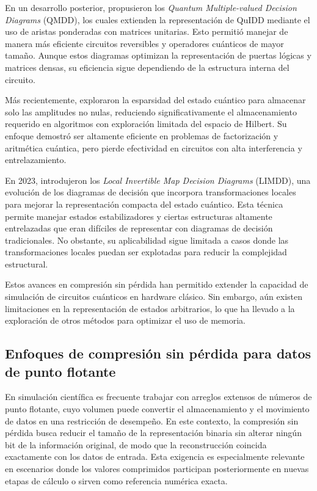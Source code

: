 En un desarrollo posterior, \textcite{Miller2006} propusieron los \textit{Quantum
Multiple-valued Decision Diagrams} (QMDD), los cuales extienden la
representación de QuIDD mediante el uso de aristas ponderadas con matrices
unitarias. Esto permitió manejar de manera más eficiente circuitos reversibles
y operadores cuánticos de mayor tamaño. Aunque estos diagramas optimizan la
representación de puertas lógicas y matrices densas, su eficiencia sigue dependiendo
de la estructura interna del circuito.

Más recientemente, \textcite{Jaques2021} exploraron la esparsidad del estado
cuántico para almacenar solo las amplitudes no nulas, reduciendo significativamente
el almacenamiento requerido en algoritmos con exploración limitada del espacio
de Hilbert. Su enfoque demostró ser altamente eficiente en problemas de
factorización y aritmética cuántica, pero pierde efectividad en circuitos con alta
interferencia y entrelazamiento.

En 2023, \textcite{Vinkhuijzen2023} introdujeron los \textit{Local Invertible
Map Decision Diagrams} (LIMDD), una evolución de los diagramas de decisión que
incorpora transformaciones locales para mejorar la representación compacta del
estado cuántico. Esta técnica permite manejar estados estabilizadores y ciertas
estructuras altamente entrelazadas que eran difíciles de representar con diagramas
de decisión tradicionales. No obstante, su aplicabilidad sigue limitada a casos
donde las transformaciones locales puedan ser explotadas para reducir la complejidad
estructural.

Estos avances en compresión sin pérdida han permitido extender la capacidad de
simulación de circuitos cuánticos en hardware clásico. Sin embargo, aún
existen limitaciones en la representación de estados arbitrarios, lo que ha llevado
a la exploración de otros métodos para optimizar el uso de memoria.

\subsection{\normalsize{Enfoques de compresión sin pérdida para datos de punto flotante}}

En simulación científica es frecuente trabajar con arreglos extensos de números de
punto flotante, cuyo volumen puede convertir el almacenamiento y el movimiento de
datos en una restricción de desempeño. En este contexto, la compresión sin pérdida
busca reducir el tamaño de la representación binaria sin alterar ningún bit de la
información original, de modo que la reconstrucción coincida exactamente con los datos
de entrada. Esta exigencia es especialmente relevante en escenarios donde los valores
comprimidos participan posteriormente en nuevas etapas de cálculo o sirven como
referencia numérica exacta.

